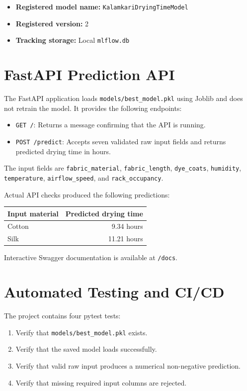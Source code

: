 \documentclass[12pt,a4paper]{article}
\begin{document}
\begin{itemize}[leftmargin=*]
    \item \textbf{Registered model name:} \texttt{KalamkariDryingTimeModel}
    \item \textbf{Registered version:} 2
    \item \textbf{Tracking storage:} Local \texttt{mlflow.db}
\end{itemize}

\section{FastAPI Prediction API}
The FastAPI application loads \texttt{models/best\_model.pkl} using Joblib and does not retrain the model. It provides the following endpoints:

\begin{itemize}[leftmargin=*]
    \item \texttt{GET /}: Returns a message confirming that the API is running.
    \item \texttt{POST /predict}: Accepts seven validated raw input fields and returns predicted drying time in hours.
\end{itemize}

The input fields are \texttt{fabric\_material}, \texttt{fabric\_length}, \texttt{dye\_coats}, \texttt{humidity}, \texttt{temperature}, \texttt{airflow\_speed}, and \texttt{rack\_occupancy}.

Actual API checks produced the following predictions:

\begin{longtable}{lr}
\toprule
\textbf{Input material} & \textbf{Predicted drying time} \\
\midrule
Cotton & 9.34 hours \\
Silk & 11.21 hours \\
\bottomrule
\end{longtable}

Interactive Swagger documentation is available at \texttt{/docs}.

\section{Automated Testing and CI/CD}
The project contains four pytest tests:

\begin{enumerate}[leftmargin=*]
    \item Verify that \texttt{models/best\_model.pkl} exists.
    \item Verify that the saved model loads successfully.
    \item Verify that valid raw input produces a numerical non-negative prediction.
    \item Verify that missing required input columns are rejected.
\end{enumerate}
\end{document}
